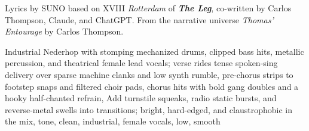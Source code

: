 
\begin{notes}
Lyrics by SUNO based on XVIII \emph{Rotterdam} of \emph{\bfseries The Leg}, %
co-written by Carlos Thompson, Claude, and ChatGPT. %
From the narrative universe \emph{Thomas’ Entourage} by Carlos Thompson.
\end{notes}
\begin{style}
Industrial Nederhop with stomping mechanized drums, clipped bass hits, metallic percussion, and theatrical female lead vocals; verse rides tense spoken-sing delivery over sparse machine clanks and low synth rumble, pre-chorus strips to footstep snaps and filtered choir pads, chorus hits with bold gang doubles and a hooky half-chanted refrain, Add turnstile squeaks, radio static bursts, and reverse-metal swells into transitions; bright, hard-edged, and claustrophobic in the mix, tone, clean, industrial, female vocals, low, smooth
\end{style}
